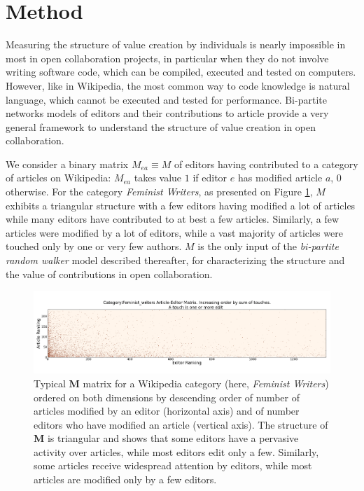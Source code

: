 \section{Method}
\label{method}
Measuring the structure of value creation by individuals is nearly impossible in most in open collaboration projects, in particular when they do not involve writing software code, which can be compiled, executed and tested on computers. However, like in Wikipedia, the most common way to code knowledge is natural language, which cannot be executed and tested for performance. Bi-partite networks models of editors and their contributions to article provide a very general framework   to understand the structure of value creation in open collaboration. 

We consider a binary matrix $M_{ea} \equiv M$ of editors having contributed to a category of articles on Wikipedia: $M_{ea}$ takes value $1$ if editor $e$ has modified article $a$, $0$ otherwise. For the category {\it Feminist Writers}, as presented on Figure \ref{fig:triangle}, $M$ exhibits a triangular structure with a few editors having modified a lot of articles while many editors have contributed to at best a few articles. Similarly, a few articles were modified by a lot of editors, while a vast majority of articles were touched only by one or very few authors. $M$ is the only input of the {\it bi-partite random walker} model described thereafter, for characterizing the structure and the value of contributions in open collaboration.

\begin{figure}[!t]
\centering
\includegraphics[width=2.0\columnwidth]{../Figures/Category_Feminist_writerstriangle_matrix_corrected.png}
\caption{Typical $\mathbf{M}$ matrix for a Wikipedia category (here, {\it Feminist Writers}) ordered on both dimensions by descending order of number of articles modified by an editor (horizontal axis) and of number editors who have modified an article (vertical axis). The structure of $\mathbf{M}$ is triangular and shows that some editors have a pervasive activity over articles, while most editors edit only a few. Similarly, some articles receive widespread attention by editors, while most articles are modified only by a few editors.}
\label{fig:triangle}
\end{figure}



